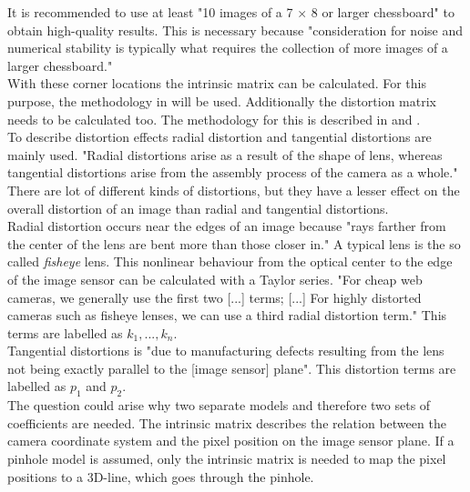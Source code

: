 \newpage

It is recommended to use at least "10 images of a 7 × 8 or larger chessboard" \cite{cv} to obtain high-quality results. \cite{cv} This is necessary because "consideration for noise and numerical stability is typically what requires the collection of more images of a larger chessboard." \cite{cv}\\ 

With these corner locations the intrinsic matrix can be calculated. For this purpose, the methodology in \cite{zhang2000} will be used. Additionally the distortion matrix needs to be calculated too. The methodology for this is described in \cite{brown} and \cite{brown_2}. \cite{cv}\\

To describe distortion effects radial distortion and tangential distortions are mainly used. "Radial distortions arise as a result of the shape of lens, whereas tangential distortions arise from the assembly process of the camera as a whole." \cite{cv} There are lot of different kinds of distortions, but they have a lesser effect on the overall distortion of an image than radial and tangential distortions. \cite{cv}\\

Radial distortion occurs near the edges of an image because "rays farther from the center of the lens are bent more than those closer in." \cite{cv} A typical lens is the so called \textit{fisheye} lens. This nonlinear behaviour from the optical center to the edge of the image sensor can be calculated with a Taylor series. "For cheap web cameras, we generally use the first two [...] terms; [...] For highly distorted cameras such as fisheye lenses, we can use a third radial distortion term." \cite{cv} This terms are labelled as $k_1,...,k_n$. \cite{cv}\\

Tangential distortions is "due to manufacturing defects resulting from the lens not being exactly parallel to the [image sensor] plane". \cite{cv} This distortion terms are labelled as $p_1$ and $p_2$. \cite{cv}\\

The question could arise why two separate models and therefore two sets of coefficients are needed. The intrinsic matrix describes the relation between the camera coordinate system and the pixel position on the image sensor plane. If a pinhole model is assumed, only the intrinsic matrix is needed to map the pixel positions to a 3D-line, which goes through the pinhole. \cite{cv} \cite{mat_calib}\\

